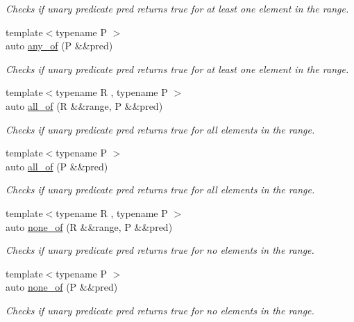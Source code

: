 \begin{DoxyCompactItemize}
\begin{DoxyCompactList}\small\item\em Checks if unary predicate pred returns true for at least one element in the range. \end{DoxyCompactList}\item 
{\footnotesize template$<$typename P $>$ }\\auto \mbox{\hyperlink{namespace_r_a_h___n_a_m_e_s_p_a_c_e_afcb8ad5a0d01fd603725fbc2c7b3fc4b}{any\+\_\+of}} (P \&\&pred)
\begin{DoxyCompactList}\small\item\em Checks if unary predicate pred returns true for at least one element in the range. \end{DoxyCompactList}\item 
{\footnotesize template$<$typename R , typename P $>$ }\\auto \mbox{\hyperlink{namespace_r_a_h___n_a_m_e_s_p_a_c_e_aec4c662eceec62042b028b7174ae6106}{all\+\_\+of}} (R \&\&range, P \&\&pred)
\begin{DoxyCompactList}\small\item\em Checks if unary predicate pred returns true for all elements in the range. \end{DoxyCompactList}\item 
{\footnotesize template$<$typename P $>$ }\\auto \mbox{\hyperlink{namespace_r_a_h___n_a_m_e_s_p_a_c_e_a227fbd8db9d61d38ce1f5511d3851250}{all\+\_\+of}} (P \&\&pred)
\begin{DoxyCompactList}\small\item\em Checks if unary predicate pred returns true for all elements in the range. \end{DoxyCompactList}\item 
{\footnotesize template$<$typename R , typename P $>$ }\\auto \mbox{\hyperlink{namespace_r_a_h___n_a_m_e_s_p_a_c_e_ad7449384fc236ed8a79ecfd52bd334c2}{none\+\_\+of}} (R \&\&range, P \&\&pred)
\begin{DoxyCompactList}\small\item\em Checks if unary predicate pred returns true for no elements in the range. \end{DoxyCompactList}\item 
{\footnotesize template$<$typename P $>$ }\\auto \mbox{\hyperlink{namespace_r_a_h___n_a_m_e_s_p_a_c_e_a7425c09d4149cbe477e18a93576d84bd}{none\+\_\+of}} (P \&\&pred)
\begin{DoxyCompactList}\small\item\em Checks if unary predicate pred returns true for no elements in the range. \end{DoxyCompactList}\item 

\end{DoxyCompactItemize}
